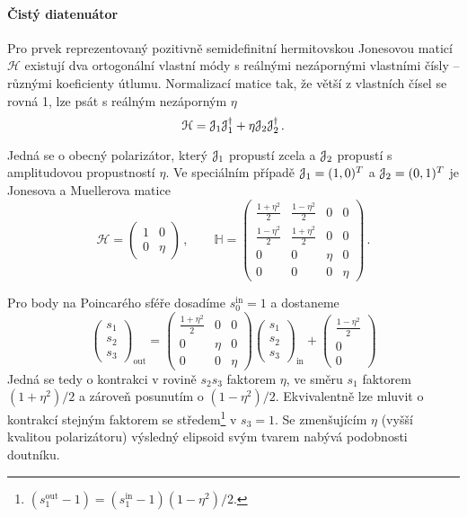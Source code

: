\paragraph{Čistý diatenuátor}

Pro prvek reprezentovaný pozitivně semidefinitní hermitovskou Jonesovou maticí $\mathcal{H}$ existují dva ortogonální vlastní módy s reálnými nezápornými vlastními čísly -- různými koeficienty útlumu.
Normalizací matice tak, že větší z vlastních čísel se rovná 1, lze psát s reálným nezáporným $\eta$
\begin{equation}
    \mathcal{H}=\mathcal{J}_1 \mathcal{J}_1^\dagger + \eta \mathcal{J}_2 \mathcal{J}_2^\dagger \,.
\end{equation}

Jedná se o obecný polarizátor, který $\mathcal{J}_1$ propustí zcela a $\mathcal{J}_2$ propustí s amplitudovou propustností $\eta$.
Ve speciálním případě $\mathcal{J}_1=(1,0)^T$ a $\mathcal{J}_2=(0,1)^T$ je Jonesova a Muellerova matice
\begin{equation}
    \mathcal{H}=\begin{pmatrix}
        1 & 0 \\ 0 & \eta
        \end{pmatrix} \,, \qquad
    \mathbb{H}=\begin{pmatrix}
        \frac{1+\eta^2}{2} & \frac{1-\eta^2}{2} & 0 & 0 \\ \frac{1-\eta^2}{2} & \frac{1+\eta^2}{2} & 0 & 0 \\
        0 & 0 & \eta & 0 \\ 0 & 0 & 0 & \eta
        \end{pmatrix} \,.
\end{equation}

Pro body na Poincarého sféře dosadíme $s_0^\textrm{in}=1$ a dostaneme
\begin{equation}
    \begin{pmatrix} s_1 \\ s_2 \\ s_3 \end{pmatrix}_{\textrm{out}}
    =\begin{pmatrix} \frac{1+\eta^2}{2} & 0 & 0 \\ 0 & \eta & 0 \\ 0 & 0 & \eta \end{pmatrix}
    \begin{pmatrix} s_1 \\ s_2 \\ s_3  \end{pmatrix}_{\textrm{in}}
    +\begin{pmatrix} \frac{1-\eta^2}{2} \\ 0 \\ 0 \end{pmatrix}
\end{equation}
Jedná se tedy o kontrakci v rovině $s_2s_3$ faktorem $\eta$, ve směru $s_1$ faktorem $(1+\eta^2)/2$ a zároveň posunutím o $(1-\eta^2)/2$.
Ekvivalentně lze mluvit o kontrakcí stejným faktorem se středem\footnote{$(s_1^\textrm{out}-1)=(s_1^\textrm{in}-1)(1-\eta^2)/2$.} v $s_3=1$.
Se zmenšujícím $\eta$ (vyšší kvalitou polarizátoru) výsledný elipsoid svým tvarem nabývá podobnosti doutníku.

